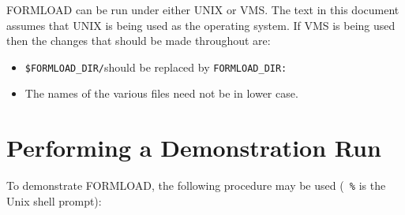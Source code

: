 FORMLOAD can be run under either UNIX or VMS. The text in this document
assumes that UNIX is being used as the operating system. If VMS is being
used then the changes that should be made throughout are:

\begin{itemize}
\item {\tt \$FORMLOAD\_DIR/}should be replaced by {\tt FORMLOAD\_DIR:}
\item The names of the various files need not be in lower case.
\end{itemize}

\section{Performing a Demonstration Run}
\label{s:demo}

To demonstrate FORMLOAD, the following procedure may be used ({\tt
\%} is the Unix shell prompt):

